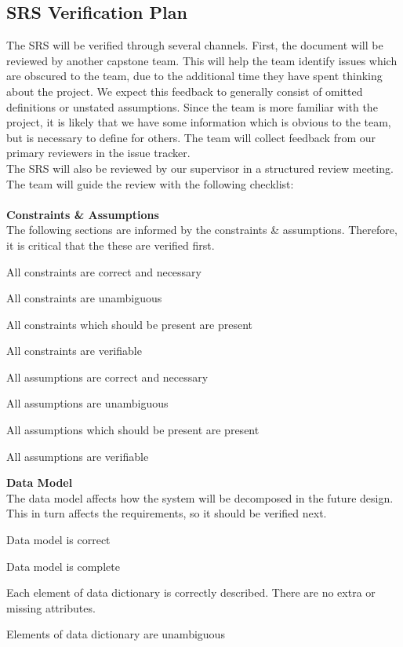 \documentclass[12pt, titlepage]{article}
\begin{document}

\subsection{SRS Verification Plan}

The SRS will be verified through several channels. First, the document will be reviewed by another capstone team. This will help the team identify issues
which are obscured to the team, due to the additional time they have spent thinking about the project. We expect this feedback to generally consist of 
omitted definitions or unstated assumptions. Since the team is more familiar with the project, it is likely that we have some information which is obvious 
to the team, but is necessary to define for others. The team will collect feedback from our primary reviewers in the issue tracker.\\
The SRS will also be reviewed by our supervisor in a structured review meeting. The team will guide the review with the following checklist:\\\\
\textbf{Constraints \& Assumptions}\\
The following sections are informed by the constraints \& assumptions. Therefore, it is critical that the these are verified first.
\begin{todolist}
\item All constraints are correct and necessary
\item All constraints are unambiguous
\item All constraints which should be present are present
\item All constraints are verifiable
\item All assumptions are correct and necessary
\item All assumptions are unambiguous
\item All assumptions which should be present are present
\item All assumptions are verifiable
\end{todolist}
\textbf{Data Model}\\
The data model affects how the system will be decomposed in the future design. This in turn affects the requirements, so it should be verified next.
\begin{todolist}
  \item Data model is correct
  \item Data model is complete
  \item Each element of data dictionary is correctly described. There are no extra or missing attributes.
  \item Elements of data dictionary are unambiguous
\end{todolist}
\end{document}
